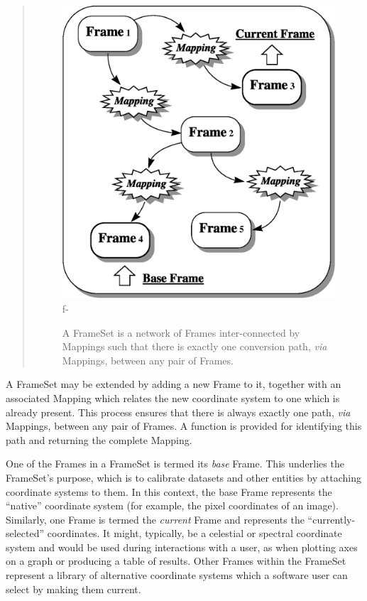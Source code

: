 \documentclass[twoside,11pt]{article}
\begin{document}
\begin{htmlonly}
\begin{quote}
\begin{figure}
   \includegraphics[scale=1.0]{sun210_figures/frameset.eps}
f-
   \caption{A FrameSet is a network of Frames inter-connected by Mappings
   such that there is exactly one conversion path, {\em{via}} Mappings,
   between any pair of Frames.}
   \end{figure}
   \end{quote}
\end{htmlonly}
A FrameSet may be extended by adding a new Frame to it, together with
an associated Mapping which relates the new coordinate system to one
which is already present.  This process ensures that there is always
exactly one path, {\em{via}} Mappings, between any pair of Frames.  A
function is provided for identifying this path and returning the
complete Mapping.

One of the Frames in a FrameSet is termed its {\em{base}} Frame.  This
underlies the FrameSet's purpose, which is to calibrate datasets and
other entities by attaching coordinate systems to them.  In this
context, the base Frame represents the ``native'' coordinate system
(for example, the pixel coordinates of an image).  Similarly, one
Frame is termed the {\em{current}} Frame and represents the
``currently-selected'' coordinates.  It might, typically, be a
celestial or spectral coordinate system and would be used during 
interactions with
a user, as when plotting axes on a graph or producing a table of
results.  Other Frames within the FrameSet represent a library of
alternative coordinate systems which a software user can select by
making them current.
\end{document}
